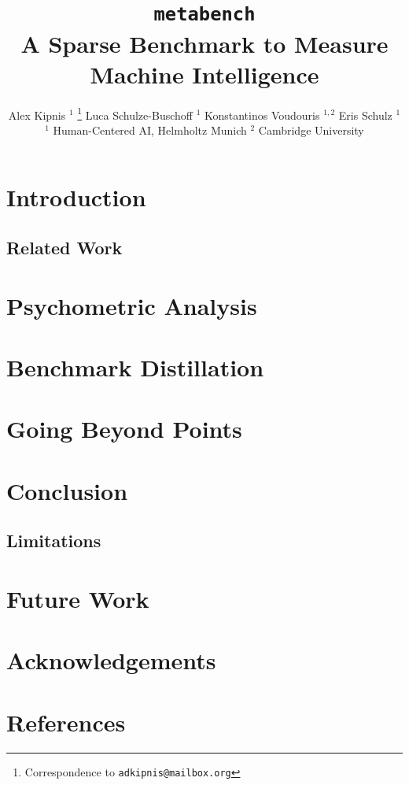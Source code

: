 \documentclass{article}
\title{\texttt{metabench}\\A Sparse Benchmark to Measure Machine Intelligence}
\author{%
   Alex Kipnis $^{1}$ \thanks{Correspondence to \texttt{adkipnis@mailbox.org}} \quad Luca Schulze-Buschoff $^{1}$ \quad Konstantinos Voudouris $^{1,2}$ \quad Eris Schulz $^1$\\
   $^1$ Human-Centered AI, Helmholtz Munich \quad $^2$ Cambridge University\\
}
\begin{document}
\maketitle

\begin{abstract}
   \lipsum[1]
\end{abstract}

\section{Introduction}
\subsection{Related Work}
\section{Psychometric Analysis}
\section{Benchmark Distillation}
\section{Going Beyond Points}
\section{Conclusion}
\subsection{Limitations}
\section{Future Work}
\section*{Acknowledgements}
\section*{References}
\end{document}
